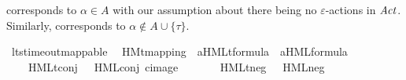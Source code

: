 \begin{isabellebody}
\begin{isamarkuptext}
 corresponds to $\alpha \in A$ with our assumption about there being no $\varepsilon$-actions in $\mathit{Act}$. Similarly, \linebreak {} corresponds to $\alpha \notin A \cup \{\tau\}$.%
\end{isamarkuptext}\isamarkuptrue%
\isamarkupfalse%
\ lts{\isacharunderscore}{\kern0pt}timeout{\isacharunderscore}{\kern0pt}mappable\ \isanewline
\isanewline
{}\isamarkupfalse%
\ HMt{\isacharunderscore}{\kern0pt}mapping\ {\isacharcolon}{\kern0pt}{\isacharcolon}{\kern0pt}\ {\isacartoucheopen}{\isacharparenleft}{\kern0pt}{\isacharprime}{\kern0pt}a{\isacharparenright}{\kern0pt}HMLt{\isacharunderscore}{\kern0pt}formula\ {\isasymRightarrow}\ {\isacharparenleft}{\kern0pt}{\isacharprime}{\kern0pt}a{\isacharparenright}{\kern0pt}HML{\isacharunderscore}{\kern0pt}formula{\isacartoucheclose}\ \isanewline
\ \ {\isacharparenleft}{\kern0pt}{\isacartoucheopen}{\isasymsigma}{\isacharprime}{\kern0pt}{\isacharparenleft}{\kern0pt}{\isacharunderscore}{\kern0pt}{\isacharprime}{\kern0pt}{\isacharparenright}{\kern0pt}{\isacartoucheclose}{\isacharparenright}{\kern0pt}\isanewline
\ \ \isanewline
\ \ \ \ {\isacartoucheopen}{\isasymsigma}{\isacharparenleft}{\kern0pt}HMLt{\isacharunderscore}{\kern0pt}conj\ {\isasymPhi}{\isacharparenright}{\kern0pt}\ {\isacharequal}{\kern0pt}\ HML{\isacharunderscore}{\kern0pt}conj\ {\isacharparenleft}{\kern0pt}cimage\ {\isacharparenleft}{\kern0pt}{\isasymlambda}\ {\isasymphi}{\isachardot}{\kern0pt}\ {\isasymsigma}{\isacharparenleft}{\kern0pt}{\isasymphi}{\isacharparenright}{\kern0pt}{\isacharparenright}{\kern0pt}\ {\isasymPhi}{\isacharparenright}{\kern0pt}{\isacartoucheclose}\isanewline
\ \ {\isacharbar}{\kern0pt}\ {\isacartoucheopen}{\isasymsigma}{\isacharparenleft}{\kern0pt}HMLt{\isacharunderscore}{\kern0pt}neg\ {\isasymphi}{\isacharparenright}{\kern0pt}\ {\isacharequal}{\kern0pt}\ HML{\isacharunderscore}{\kern0pt}neg\ {\isasymsigma}{\isacharparenleft}{\kern0pt}{\isasymphi}{\isacharparenright}{\kern0pt}{\isacartoucheclose}\isanewline

\end{isabellebody}

